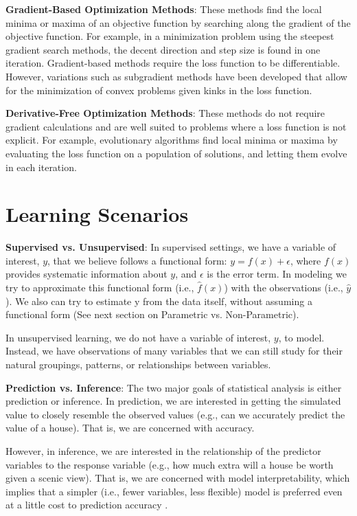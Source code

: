 \textbf{Gradient-Based Optimization Methods}: These methods find the local minima or maxima of an objective function by searching along the gradient of the objective function. For example, in a minimization problem using the steepest gradient search methods, the decent direction and step size is found in one iteration. Gradient-based methods require the loss function to be differentiable. However, variations such as subgradient methods have been developed that allow for the minimization of convex problems given kinks in the loss function. 
 
\textbf{Derivative-Free Optimization Methods}: These methods do not require gradient calculations and are well suited to problems where a loss function is not explicit. For example, evolutionary algorithms find local minima or maxima by evaluating the loss function on a population of solutions, and letting them evolve in each iteration. 

\section*{Learning Scenarios}
\textbf{Supervised vs. Unsupervised}: In supervised settings, we have a variable of interest, $y$, that we believe follows a functional form: $y=f(x)+\epsilon$, where $f(x)$ provides systematic information about $y$, and $\epsilon$ is the error term. In modeling we try to approximate this functional form (i.e., $\hat{f}(x)$) with the observations (i.e., $\hat{y}$). We also can try to estimate y from the data itself, without assuming a functional form (See next section on Parametric vs. Non-Parametric). 

In unsupervised learning, we do not have a variable of interest, $y$, to model. Instead, we have observations of many variables that we can still study for their natural groupings, patterns, or relationships between variables.

\textbf{Prediction vs. Inference}: The two major goals of statistical analysis is either prediction or inference. In prediction, we are interested in getting the simulated value to closely resemble the observed values (e.g., can we accurately predict the value of a house). That is, we are concerned with accuracy. 

However, in inference, we are interested in the relationship of the predictor variables to the response variable (e.g., how much extra will a house be worth given a scenic view). That is, we are concerned with model interpretability, which implies that a simpler (i.e., fewer variables, less flexible) model is preferred even at a little cost to prediction accuracy \cite{james2013introduction}. 

